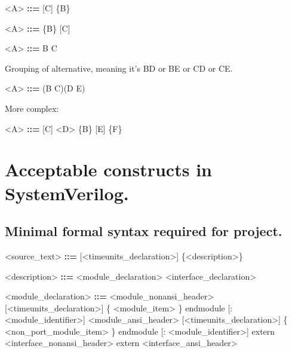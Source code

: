 \documentclass{article}
\begin{document}
\begin{grammar}
    <A> \textbf{::=} [C] \{B\}
\end{grammar}

\begin{grammar}
    <A> \textbf{::=} \{B\} [C]
\end{grammar}

\begin{grammar}
    <A> \textbf{::=} B \alt C
\end{grammar}

Grouping of alternative, meaning it's BD or BE or CD or CE.
\begin{grammar}
    <A> \textbf{::=} (B \alt C)(D \alt E)
\end{grammar}

More complex:

\begin{grammar}
    <A> \textbf{::=} [C] <D> \{B\} [E] \{F\}
\end{grammar}


\section{Acceptable constructs in SystemVerilog.}

\subsection{Minimal formal syntax required for project.}

\begin{grammar}
    <source_text> \textbf{::=} [<timeunits_declaration>] \{<description>\}
\end{grammar}

\begin{grammar}
    <description> \textbf{::=} <module_declaration>
                               \alt <interface_declaration>
\end{grammar}

\begin{grammar}
    <module_declaration> \textbf{::=} <module_nonansi_header> [<timeunits_declaration>] \{ <module_item> \} endmodule
                                      [: <module_identifier>]
                                      \alt <module_ansi_header> [<timeunits_declaration>] \{ <non_port_module_item> \} endmodule
                                      [: <module_identifier>]
                                      \alt extern <interface_nonansi_header>
                                      \alt extern <interface_ansi_header>
\end{grammar}
\end{document}
